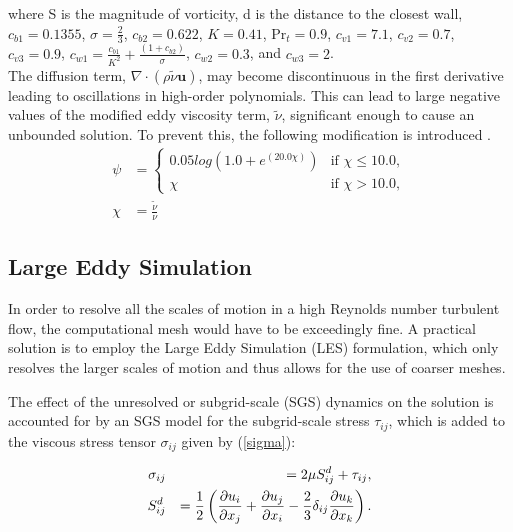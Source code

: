 where S is the magnitude of vorticity, d is the  distance to the closest wall, $c_{b1} = 0.1355$, $\sigma = \frac{2}{3}$, $c_{b2} = 0.622$, $K = 0.41$, $\text{Pr}_t = 0.9$, $c_{v1} = 7.1$, $c_{v2} = 0.7$, $c_{v3} = 0.9$, $c_{w1} = \frac{c_{b1}}{K^2} + \frac{(1+c_{b2})}{\sigma}$, $c_{w2} = 0.3$, and $c_{w3} = 2$.\\

The diffusion term, $\nabla\cdot(\rho\tilde\nu\boldsymbol{u})$, may become discontinuous in the first derivative leading to oscillations in high-order polynomials. This can lead to large negative values of the modified eddy viscosity term, $\tilde\nu$, significant enough to cause an unbounded solution. To prevent this, the following modification is introduced \cite{moro2011navier}.
\begin{align}
	\psi &=
	\begin{cases}
	   0.05log(1.0 + e^{(20.0\chi)}) & \text{if } \chi \le 10.0, \\
	   \chi & \text{if } \chi > 10.0,
	\end{cases} \\
	\chi &= \frac{\tilde\nu}{\nu}
\end{align}

\subsection{Large Eddy Simulation}\label{lesmodels}

In order to resolve all the scales of motion in a high Reynolds number turbulent flow, the computational mesh would have to be exceedingly fine.
A practical solution is to employ the Large Eddy Simulation (LES) formulation, which only resolves the larger scales of motion and thus allows for the use of coarser meshes.

The effect of the unresolved or subgrid-scale (SGS) dynamics on the solution is accounted for by an SGS model for the subgrid-scale stress $\tau_{ij}$, which is added to the viscous stress tensor $\sigma_{ij}$ given by (\ref{sigma}):

\begin{eqnarray}\label{tausgs}
\sigma_{ij} &&= 2 \mu S^d_{ij} + \tau_{ij},\\
S^d_{ij} &&= \frac 1 2 \left( \frac{\partial u_i}{\partial x_j} + \frac{\partial u_j}{\partial x_i} - \frac{2}{3} \delta_{ij}\frac{\partial u_k}{\partial x_k} \right).
\end{eqnarray}

